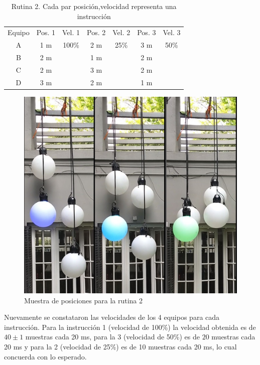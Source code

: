 \begin{table}[!ht]
	\begin{center}
		\begin{tabular}{|c|c|c|c|c|c|c|}
			\hline
			\rowcolor{OODlightblue}
			Equipo & Pos. 1 & Vel. 1 & Pos. 2 & Vel. 2 & Pos. 3 & Vel. 3\\
			
			A & 1 m & 100\% & 2 m &  25\% & 3 m &  50\% \\
			
			B & 2 m &  & 1 m &  & 2 m &   \\
			
			C & 2 m &  & 3 m &  & 2 m &   \\
			
			D & 3 m &  & 2 m &  & 1 m &   \\
			\hline
		\end{tabular}
	\end{center}
	\caption{Rutina 2. Cada par posición,velocidad representa una instrucción}
	\label{table:\thetable}
\end{table}

\begin{figure}[!ht]
	\centering
	\includegraphics[width=14cm,scale=1]{resources/4_6-cuelist2_resultados.jpg}
	\caption{Muestra de posiciones para la rutina 2}
	\label{fig:\thefigure}
\end{figure}

Nuevamente se constataron las velocidades de los 4 equipos para cada instrucción. Para la instrucción 1 (velocidad de 100\%) la velocidad obtenida es de \(40 \pm 1\) muestras cada 20 ms, para la 3 (velocidad de 50\%) es de \(20\) muestras cada 20 ms y para la 2 (velocidad de 25\%) es de 10 muestras cada 20 ms, lo cual concuerda con lo esperado.






